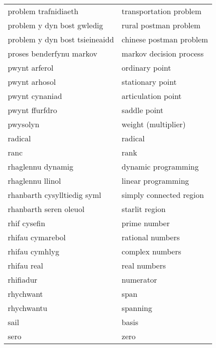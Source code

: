 \begin{supertabular}{p{0.22\textwidth}p{0.22\textwidth}}
           problem trafnidiaeth &           transportation problem \\
     problem y dyn bost gwledig &            rural postman problem \\
 problem y dyn bost tsieineaidd &          chinese postman problem \\
       proses benderfynu markov &          markov decision process \\
                  pwynt arferol &                   ordinary point \\
                  pwynt arhosol &                 stationary point \\
                 pwynt cynaniad &               articulation point \\
                 pwynt ffurfdro &                     saddle point \\
                       pwysolyn &              weight (multiplier) \\
                        radical &                          radical \\
                           ranc &                             rank \\
              rhaglennu dynamig &              dynamic programming \\
               rhaglennu llinol &               linear programming \\
    rhanbarth cysylltiedig syml &          simply connected region \\
         rhanbarth seren oleuol &                   starlit region \\
                   rhif cysefin &                     prime number \\
               rhifau cymarebol &                 rational numbers \\
                 rhifau cymhlyg &                  complex numbers \\
                    rhifau real &                     real numbers \\
                      rhifiadur &                        numerator \\
                      rhychwant &                             span \\
                     rhychwantu &                         spanning \\
                           sail &                            basis \\
                           sero &                             zero \\

\end{supertabular}
